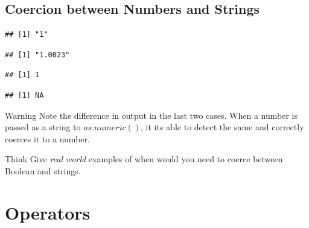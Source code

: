 \documentclass[12pt]{book}\usepackage{knitr}
\begin{document}
\subsection{Coercion between Numbers and Strings}
\begin{knitrout}
\color{fgcolor}\begin{kframe}
\begin{alltt}
\hlstd{(}\hlstd{)} 
\end{alltt}
\begin{verbatim}
## [1] "1"
\end{verbatim}
\begin{alltt}
\hlstd{(}\hlstd{)} 
\end{alltt}
\begin{verbatim}
## [1] "1.0023"
\end{verbatim}
\begin{alltt}
\hlstd{(}\hlstd{)} 
\end{alltt}
\begin{verbatim}
## [1] 1
\end{verbatim}
\begin{alltt}
\hlstd{(}\hlstd{)} 
\end{alltt}


{\ttfamily\noindent\color{warningcolor}{\#\# Warning: NAs introduced by coercion}}\begin{verbatim}
## [1] NA
\end{verbatim}
\end{kframe}
\end{knitrout}
\begin{DIY}{Warning}
Note the difference in output in the last two cases. When a number is passed as a string to $as.numeric()$, it its able to detect the same and correctly coerces it to a number. 
\end{DIY}

\begin{DIY}{Think}
Give \emph{real world} examples of when would you need to coerce between Boolean and strings.
\end{DIY}


\section{Operators}
\begin{HIGHLIGHT}
\par{}
\end{HIGHLIGHT}
\end{document}
